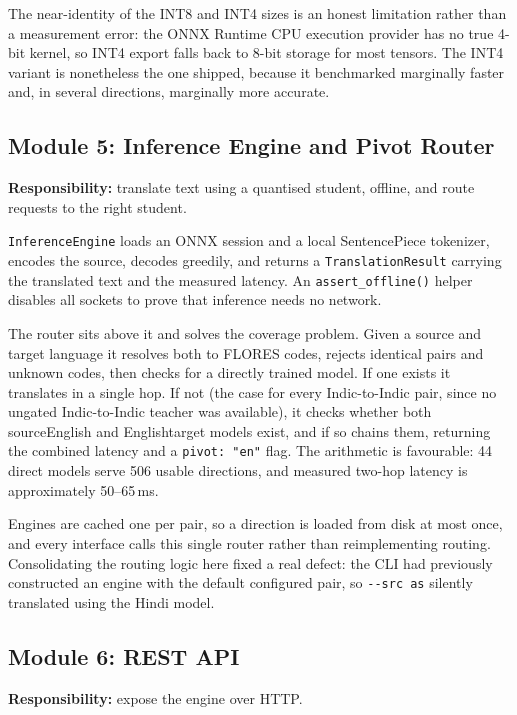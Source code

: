 The near-identity of the INT8 and INT4 sizes is an honest limitation rather than
a measurement error: the ONNX Runtime CPU execution provider has no true 4-bit
kernel, so INT4 export falls back to 8-bit storage for most tensors. The INT4
variant is nonetheless the one shipped, because it benchmarked marginally faster
and, in several directions, marginally more accurate.

\subsection{Module 5: Inference Engine and Pivot Router}
\label{subsec:mod5}

\textbf{Responsibility:} translate text using a quantised student, offline, and
route requests to the right student.

\texttt{InferenceEngine} loads an ONNX session and a local SentencePiece
tokenizer, encodes the source, decodes greedily, and returns a
\texttt{TranslationResult} carrying the translated text and the measured
latency. An \texttt{assert\_offline()} helper disables all sockets to prove that
inference needs no network.

The router sits above it and solves the coverage problem. Given a source and
target language it resolves both to FLORES codes, rejects identical pairs and
unknown codes, then checks for a directly trained model. If one exists it
translates in a single hop. If not (the case for every Indic-to-Indic pair,
since no ungated Indic-to-Indic teacher was available), it checks whether both
source\arrowto{}English and English\arrowto{}target models exist, and if so
chains them, returning the combined latency and a \texttt{pivot: "en"} flag. The
arithmetic is favourable: 44 direct models serve 506 usable directions, and
measured two-hop latency is approximately 50--65\,ms.

Engines are cached one per pair, so a direction is loaded from disk at most
once, and every interface calls this single router rather than reimplementing
routing. Consolidating the routing logic here fixed a real defect: the CLI had
previously constructed an engine with the default configured pair, so
\texttt{-{}-src as} silently translated using the Hindi model.

\subsection{Module 6: REST API}
\label{subsec:mod6}

\textbf{Responsibility:} expose the engine over HTTP.

